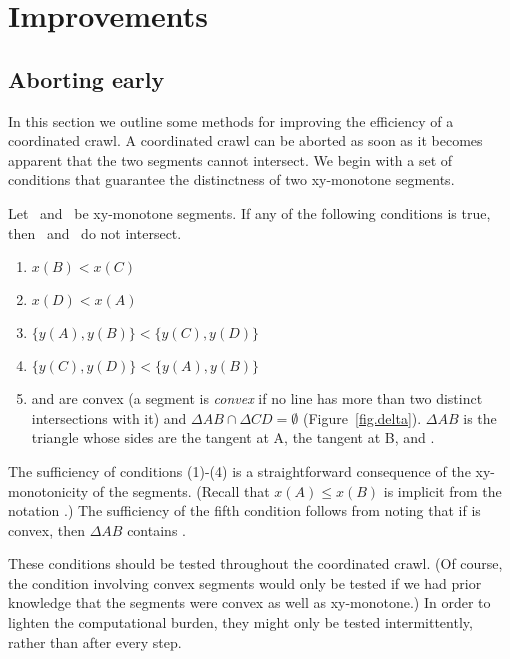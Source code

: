 \section{Improvements}
\label{sec.improve}

\subsection{Aborting early}

In this section we outline some methods for improving the efficiency of a 
coordinated crawl.
A coordinated crawl can be aborted as soon as it becomes apparent that the two 
segments cannot intersect.
We begin with a set of conditions that guarantee the distinctness of two 
xy-monotone segments.

\begin{lemma}
\label{lem-badconds}
Let \ and \ be xy-monotone segments.
If any of the following conditions is true, then \ and \ do not
intersect.  
\begin{enumerate}
	\item $x(B) < x(C)$
	\item $x(D) < x(A)$
	\item $\{y(A),y(B)\} < \{y(C),y(D)\}$
	\item $\{y(C),y(D)\} < \{y(A),y(B)\}$
	\item {} and  are convex (a segment is {\em convex} if
			no line has more than two distinct intersections with it)
	    	and $\Delta AB \cap \Delta CD = \emptyset$ (Figure~\ref{fig.delta}).
	$\Delta AB$ is the triangle whose sides are the tangent at 
	A, the tangent at B, and .
\end{enumerate}
\end{lemma}
%
The sufficiency of conditions (1)-(4) is a straightforward consequence of the 
xy-monotonicity of the segments.
(Recall that $x(A) \leq x(B)$ is implicit 
	from the notation .)
The sufficiency of the fifth condition follows from noting that
if  is convex, then $\Delta AB$ contains .
\QED

These conditions should be tested throughout the coordinated crawl.
(Of course, the condition involving convex segments would only be tested if we had
prior knowledge that the segments were convex as well as xy-monotone.)
In order to lighten the computational burden, they might only be tested intermittently, 
rather than after every step.

